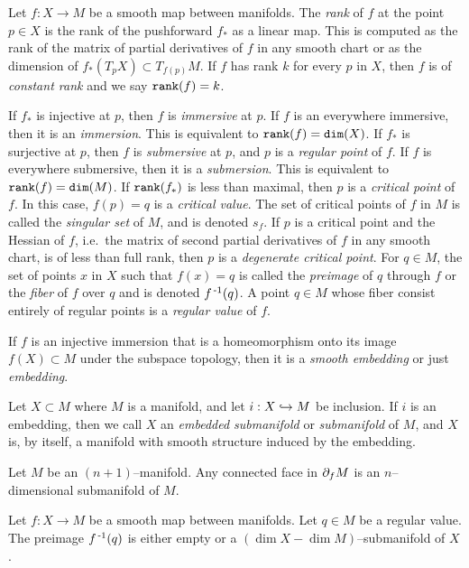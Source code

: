 \begin{defn}[Embedding]
	Let $f:X\to M$ be a smooth map between manifolds.
	The \emph{rank} of $f$ at the point $p\in X$ is the rank of the pushforward $f_*$ as a linear map.
	This is computed as the rank of the matrix of partial derivatives of $f$ in any smooth chart or as the dimension of $f_*(T_p X)\subset T_{f(p)} M$.
	If $f$ has rank $k$ for every $p$ in $X$, then $f$ is of \emph{constant rank} and we say $\texttt{rank}(f)=k$.
		
	If $f_*$ is injective at $p$, then $f$ is \emph{immersive} at $p$.
	If $f$ is an everywhere immersive, then it is an \emph{immersion}.
	This is equivalent to $\texttt{rank}(f)=\texttt{dim}(X)$.
	If $f_*$ is surjective at $p$, then $f$ is \emph{submersive} at $p$, and $p$ is a \emph{regular point} of $f$.
	If $f$ is everywhere submersive, then it is a \emph{submersion}.
	This is equivalent to $\texttt{rank}(f)=\texttt{dim}(M)$.
	If $\texttt{rank}(f_*)$ is less than maximal, then $p$ is a \emph{critical point} of $f$.
	In this case, $f(p)=q$ is a \emph{critical value}.
	The set of critical points of $f$ in $M$ is called the \emph{singular set} of $M$, and is denoted $s_f$.
	If $p$ is a critical point and the Hessian of $f$, i.e.\ the matrix of second partial derivatives of $f$ in any smooth chart, is of less than full rank, then $p$ is a \emph{degenerate critical point}.
	For $q\in M$, the set of points $x$ in $X$ such that $f(x)=q$ is called the \emph{preimage} of $q$ through $f$ or the \emph{fiber} of $f$ over $q$ and is denoted $f^{\,\text{-}1}(q)$.
	A point $q \in M$ whose fiber consist entirely of regular points is a \emph{regular value} of $f$.
	
	If $f$ is an injective immersion that is a homeomorphism onto its image $f(X)\subset M$ under the subspace topology, then it is a \emph{smooth embedding} or just \emph{embedding}.
	
	Let $X\subset M$ where $M$ is a manifold, and let $i:X\hookrightarrow M$ be inclusion.
	If $i$ is an embedding, then we call $X$ an \emph{embedded submanifold} or \emph{submanifold} of $M$, and $X$ is, by itself, a manifold with smooth structure induced by the embedding.
\end{defn}

\begin{prop}
	\label{prop:boundariesaremanifolds}
	Let $M$ be an $(n+1)$--manifold.
	Any connected face in $\partial_f M$ is an $n$--dimensional submanifold of $M$.
\end{prop}

\begin{theorem}
	Let $f:X\to M$ be a smooth map between manifolds.
	Let $q\in M$ be a regular value.
	The preimage $f^{\,\text{-}1}(q)$ is either empty or a $(\dim X-\dim M)$--submanifold of $X$.
\end{theorem}

